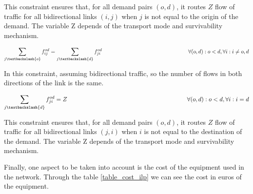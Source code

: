 This constraint ensures that, for all demand pairs $(o,d)$, it routes $Z$ flow of traffic for all bidirectional links $(i,j)$ when $j$ is not equal to the origin of the demand. The variable Z depends of the transport mode and survivability mechanism.

\begin{equation}
\sum_{j\textbackslash \{o\}} f_{ij}^{od} = \sum_{j\textbackslash \{d\}} f_{ji}^{od}   \qquad \qquad \qquad \qquad \qquad \qquad \qquad \qquad
\forall(o,d) : o < d, \forall i: i \neq o,d
\label{ILPOpaque2_CAPEX}
\end{equation}

In this constraint, assuming bidirectional traffic, so the number of flows in both directions of the link is the same.

\begin{equation}
\sum_{j\textbackslash \{d\}} f_{ji}^{od} = Z  \qquad \qquad \qquad \qquad \qquad \qquad \qquad \qquad \qquad \qquad
\forall(o,d) : o < d, \forall i: i = d
\label{ILPOpaque3_CAPEX}
\end{equation}

This constraint ensures that, for all demand pairs $(o,d)$, it routes $Z$ flow of traffic for all bidirectional links $(j,i)$ when $i$ is not equal to the destination of the demand. The variable Z depends of the transport mode and survivability mechanism.\\

\vspace{13pt}

Finally, one aspect to be taken into account is the cost of the equipment used in the network. Through the table \ref{table_cost_ilp} we can see the cost in euros of the equipment.\\

